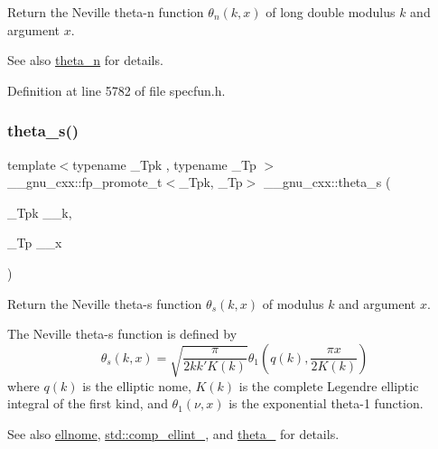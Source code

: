 Return the Neville theta-\/n function $ \theta_n(k,x) $ of {\ttfamily long double} modulus $ k $ and argument $ x $.

\begin{DoxySeeAlso}{See also}
\hyperlink{group__gnu__math__spec__func_ga202778bd650e04e9f3729bfca35c32e2}{theta\+\_\+n} for details. 
\end{DoxySeeAlso}


Definition at line 5782 of file specfun.\+h.

\mbox{\label{group__gnu__math__spec__func_gaf28f2dca107531890b49cccf2bdd67be}} 
\subsubsection{\texorpdfstring{theta\+\_\+s()}{theta\_s()}}
{\footnotesize\ttfamily template$<$typename \+\_\+\+Tpk , typename \+\_\+\+Tp $>$ \\
\+\_\+\+\_\+gnu\+\_\+cxx\+::fp\+\_\+promote\+\_\+t$<$\+\_\+\+Tpk, \+\_\+\+Tp$>$ \+\_\+\+\_\+gnu\+\_\+cxx\+::theta\+\_\+s (\begin{DoxyParamCaption}\item[{\+\_\+\+Tpk}]{\+\_\+\+\_\+k,  }\item[{\+\_\+\+Tp}]{\+\_\+\+\_\+x }\end{DoxyParamCaption})\hspace{0.3cm}{\ttfamily [inline]}}

Return the Neville theta-\/s function $ \theta_s(k,x) $ of modulus $ k $ and argument $ x $.

The Neville theta-\/s function is defined by \[ \theta_s(k,x) = \sqrt{\frac{\pi}{2 k k' K(k)}} \theta_1\left(q(k),\frac{\pi x}{2K(k)}\right) \] where $ q(k) $ is the elliptic nome, $ K(k) $ is the complete Legendre elliptic integral of the first kind, and $ \theta_1(\nu,x) $ is the exponential theta-\/1 function. \begin{DoxySeeAlso}{See also}
\hyperlink{group__gnu__math__spec__func_ga7bfb34f8b5c0ed7c72040f9cb7034bba}{ellnome}, \hyperlink{group__tr29124__math__spec__func_gad559217fb01e7a8b7a6e23eeedda64be}{std\+::comp\+\_\+ellint\+\_}, and \hyperlink{group__gnu__math__spec__func_gaa2e5a3a5f550fe032a596a8b01c878c0}{theta\+\_} for details.
\end{DoxySeeAlso}

